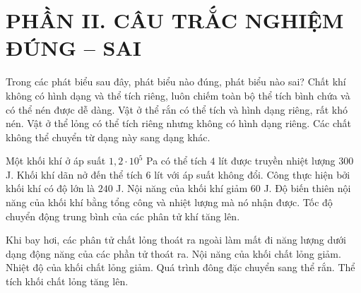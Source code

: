 \section*{PHẦN II. CÂU TRẮC NGHIỆM ĐÚNG -- SAI}

\begin{ex}
Trong các phát biểu sau đây, phát biểu nào đúng, phát biểu nào sai?
\choiceTF
{\True Chất khí không có hình dạng và thể tích riêng, luôn chiếm toàn bộ thể tích bình chứa và có thể nén được dễ dàng.}
{\True Vật ở thể rắn có thể tích và hình dạng riêng, rất khó nén.}
{\True Vật ở thể lỏng có thể tích riêng nhưng không có hình dạng riêng.}
{Các chất không thể chuyển từ dạng này sang dạng khác.}
\end{ex}

\begin{ex}
Một khối khí ở áp suất $1,2\cdot10^5$ Pa có thể tích $4$ lít được truyền nhiệt lượng $300$ J. Khối khí dãn nở đến thể tích $6$ lít với áp suất không đổi.
\choiceTF
{\True Công thực hiện bởi khối khí có độ lớn là $240$ J.}
{Nội năng của khối khí giảm $60$ J.}
{\True Độ biến thiên nội năng của khối khí bằng tổng công và nhiệt lượng mà nó nhận được.}
{\True Tốc độ chuyển động trung bình của các phân tử khí tăng lên.}
\end{ex}

\begin{ex}
Khi bay hơi, các phân tử chất lỏng thoát ra ngoài làm mất đi năng lượng dưới dạng động năng của các phần tử thoát ra.
\choiceTF
{\True Nội năng của khối chất lỏng giảm.}
{\True Nhiệt độ của khối chất lỏng giảm.}
{Quá trình đông đặc chuyển sang thể rắn.}
{Thể tích khối chất lỏng tăng lên.}
\end{ex}

